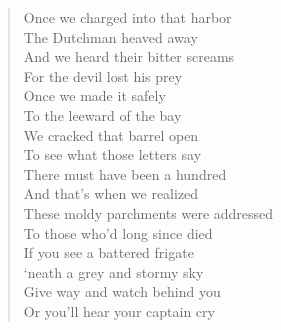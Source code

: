 \documentclass[11pt]{article}
\begin{document}
\begin{verse}
\vspace*{1em}
Once we charged into that harbor\\
The Dutchman heaved away\\
And we heard their bitter screams\\
For the devil lost his prey\\
Once we made it safely\\
To the leeward of the bay\\
We cracked that barrel open\\
To see what those letters say\\
There must have been a hundred\\
And that's when we realized\\
These moldy parchments were addressed\\
To those who'd long since died\\
If you see a battered frigate\\
‘neath a grey and stormy sky\\
Give way and watch behind you\\
Or you'll hear your captain cry\\
\end{verse}
\clearpage
\end{document}
